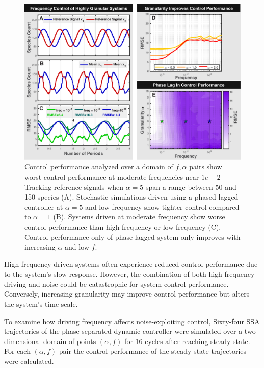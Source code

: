\documentclass[12pt]{article}
\begin{document}
\begin{figure}
\begin{center}
\includegraphics[width=1\textwidth]{Frequency.pdf}
\vspace{-0.1in}
\caption{Control performance analyzed over a domain of $f,\alpha$ pairs show worst control performance at moderate frequencies near $1e-2$ Tracking reference signals when $\alpha=5$ span a range between 50 and 150 species (A). Stochastic simulations driven using a phased lagged controller at $\alpha = 5$ and low frequency show tighter control compared to $\alpha =1$ (B). Systems driven at moderate frequency show worse control performance than high frequency or low frequency (C). Control performance only of phase-lagged system only improves with increasing $\alpha$ and low $f$.}
\label{CRG}
\end{center}
\vspace{-0.2in}
\end{figure}

High-frequency driven systems often experience reduced control performance due to the system's slow response.  However, the combination of both high-frequency driving and noise could be catastrophic for system control performance. Conversely, increasing granularity may improve control performance but alters the system's time scale.

To examine how driving frequency affects noise-exploiting control, Sixty-four SSA trajectories of the phase-separated dynamic controller were simulated over a two dimensional domain of points $(\alpha,f)$ for 16 cycles after reaching steady state. For each $(\alpha,f)$ pair the control performance of the steady state trajectories were calculated.
\end{document}

